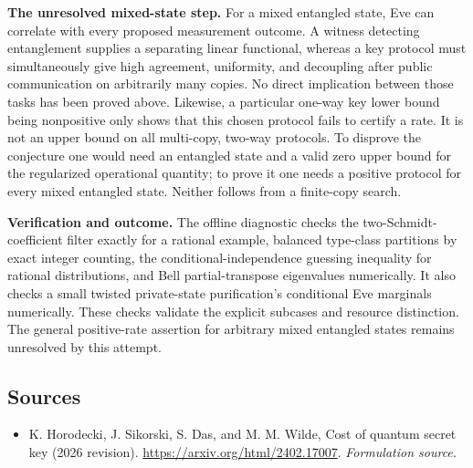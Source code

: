 \documentclass[11pt]{article}
\begin{document}
\textbf{The unresolved mixed-state step.}
For a mixed entangled state, Eve can correlate with every proposed measurement
outcome.  A witness detecting entanglement supplies a separating linear
functional, whereas a key protocol must simultaneously give high agreement,
uniformity, and decoupling after public communication on arbitrarily many
copies.  No direct implication between those tasks has been proved above.
Likewise, a particular one-way key lower bound being nonpositive only shows
that this chosen protocol fails to certify a rate.  It is not an upper bound
on all multi-copy, two-way protocols.  To disprove the conjecture one would
need an entangled state and a valid zero upper bound for the regularized
operational quantity; to prove it one needs a positive protocol for every
mixed entangled state.  Neither follows from a finite-copy search.

\textbf{Verification and outcome.}
The offline diagnostic checks the two-Schmidt-coefficient filter exactly for
a rational example, balanced type-class partitions by exact integer counting,
the conditional-independence guessing inequality for rational distributions,
and Bell partial-transpose eigenvalues numerically.  It also checks a small
twisted private-state purification's conditional Eve marginals numerically.
These checks validate the explicit subcases and resource distinction.  The
general positive-rate assertion for arbitrary mixed entangled states remains
unresolved by this attempt.
\subsection{Sources}
\begin{itemize}
\item[S1]K. Horodecki, J. Sikorski, S. Das, and M. M. Wilde, Cost of quantum secret key (2026 revision).
\url{https://arxiv.org/html/2402.17007}.
\textit{Formulation source.}
\end{itemize}
\end{document}
